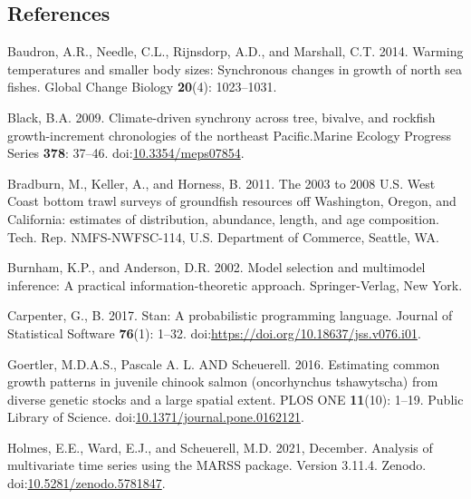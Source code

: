 \documentclass[
]{article}
\newlength{\cslhangindent}
\newlength{\cslentryspacingunit} %
\newenvironment{CSLReferences}[2] %
 {%
  \setlength{\parindent}{0pt}
  \ifodd #1
  \let\oldpar\par
  \def\par{\hangindent=\cslhangindent\oldpar}
  \fi
  \setlength{\parskip}{#2\cslentryspacingunit}
 }%
 {}
\newcommand{\meps}{Marine Ecology Progress Series\xspace}
\begin{document}
\pagebreak

\hypertarget{references}{%
\subsection*{References}\label{references}}

\hypertarget{refs}{}
\begin{CSLReferences}{1}{0}
\leavevmode{}%
Baudron, A.R., Needle, C.L., Rijnsdorp, A.D., and Marshall, C.T. 2014.
Warming temperatures and smaller body sizes: Synchronous changes in
growth of north sea fishes. Global Change Biology \textbf{20}(4):
1023--1031.

\leavevmode{}%
Black, B.A. 2009. {Climate-driven synchrony across tree, bivalve, and
rockfish growth-increment chronologies of the northeast Pacific}.\meps
\textbf{378}: 37--46.
doi:\href{https://doi.org/10.3354/meps07854}{10.3354/meps07854}.

\leavevmode{}%
Bradburn, M., Keller, A., and Horness, B. 2011. {The 2003 to 2008 U.S.
West Coast bottom trawl surveys of groundfish resources off Washington,
Oregon, and California: estimates of distribution, abundance, length,
and age composition}. {Tech. Rep. NMFS-NWFSC-114, U.S. Department of
Commerce, Seattle, WA}.

\leavevmode{}%
Burnham, K.P., and Anderson, D.R. 2002. Model selection and multimodel
inference: A practical information-theoretic approach. Springer-Verlag,
New York.

\leavevmode{}%
Carpenter, G., B. 2017. Stan: A probabilistic programming language.
Journal of Statistical Software \textbf{76}(1): 1--32.
doi:\url{https://doi.org/10.18637/jss.v076.i01}.

\leavevmode{}%
Goertler, M.D.A.S., Pascale A. L. AND Scheuerell. 2016. Estimating
common growth patterns in juvenile chinook salmon (oncorhynchus
tshawytscha) from diverse genetic stocks and a large spatial extent.
PLOS ONE \textbf{11}(10): 1--19. Public Library of Science.
doi:\href{https://doi.org/10.1371/journal.pone.0162121}{10.1371/journal.pone.0162121}.

\leavevmode{}%
Holmes, E.E., Ward, E.J., and Scheuerell, M.D. 2021, December. {Analysis
of multivariate time series using the MARSS package. Version 3.11.4}.
Zenodo.
doi:\href{https://doi.org/10.5281/zenodo.5781847}{10.5281/zenodo.5781847}.


\end{CSLReferences}
\end{document}
